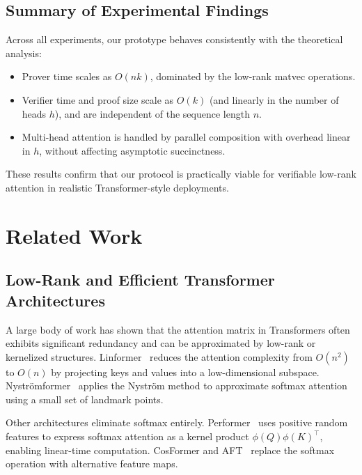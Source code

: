 \documentclass[11pt]{article}
\begin{document}
\subsection{Summary of Experimental Findings}
\label{subsec:exp-summary}

Across all experiments, our prototype behaves consistently with the
theoretical analysis:

\begin{itemize}
  \item Prover time scales as $O(nk)$, dominated by the low-rank matvec
        operations.
  \item Verifier time and proof size scale as $O(k)$ (and linearly in
        the number of heads $h$), and are independent of the sequence
        length $n$.
  \item Multi-head attention is handled by parallel composition with
        overhead linear in $h$, without affecting asymptotic succinctness.
\end{itemize}

These results confirm that our protocol is practically viable for
verifiable low-rank attention in realistic Transformer-style deployments.



\section{Related Work}

\subsection{Low-Rank and Efficient Transformer Architectures}

A large body of work has shown that the attention matrix in
Transformers often exhibits significant redundancy and can be
approximated by low-rank or kernelized structures.
Linformer~\cite{wang2020linformer} reduces the attention complexity from
$O(n^2)$ to $O(n)$ by projecting keys and values into a low-dimensional
subspace.  
Nyströmformer~\cite{xiong2021nystromformer} applies the Nyström method
to approximate softmax attention using a small set of landmark points.

Other architectures eliminate softmax entirely.  
Performer~\cite{choromanski2021performer} uses positive random features
to express softmax attention as a kernel product
$\phi(Q)\phi(K)^\top$, enabling linear-time computation.  
CosFormer and AFT~\cite{shi2021cosformer, zhu2021aft} replace the
softmax operation with alternative feature maps.
\end{document}
